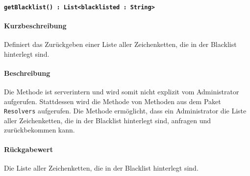 \paragraph{\texttt{getBlacklist() : List<blacklisted : String>}}%
\paragraph*{Kurzbeschreibung}
Definiert das Zurückgeben einer Liste aller Zeichenketten, die in der Blacklist hinterlegt sind.
\paragraph*{Beschreibung}
Die Methode ist serverintern und wird somit nicht explizit vom Administrator aufgerufen.
Stattdessen wird die Methode von Methoden aus dem Paket \texttt{Resolvers} aufgerufen.
Die Methode ermöglicht, dass ein Administrator die Liste aller Zeichenketten, die in der Blacklist hinterlegt sind, anfragen und zurückbekommen kann.
\paragraph*{Rückgabewert}
Die Liste aller Zeichenketten, die in der Blacklist hinterlegt sind.

